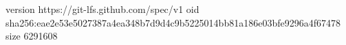 version https://git-lfs.github.com/spec/v1
oid sha256:eae2e53e5027387a4ea348b7d9d4c9b5225014bb81a186e03bfe9296a4f67478
size 6291608
